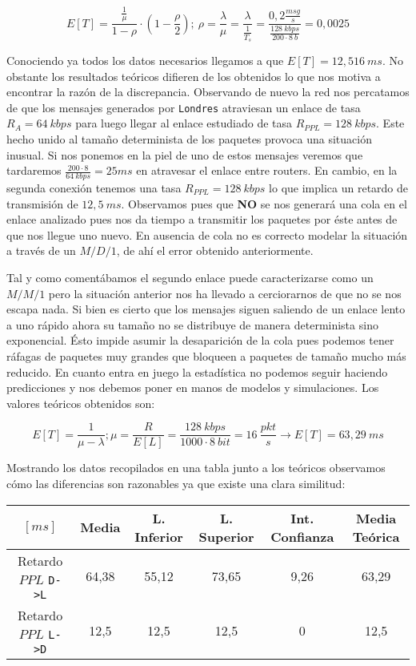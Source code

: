 \documentclass{article}[10pt]
\begin{document}
		$$E[T] = \frac{\frac{1}{\mu}}{1 - \rho} \cdot (1 - \frac{\rho}{2});\ \rho = \frac{\lambda}{\mu} = \frac{\lambda}{\frac{1}{T_s}} = \frac{0,2 \frac{msg}{s}}{\frac{128\ kbps}{200 \cdot 8\ b}} = 0,0025$$

		Conociendo ya todos los datos necesarios llegamos a que $E[T] = 12,516\ ms$. No obstante los resultados teóricos difieren de los obtenidos lo que nos motiva a encontrar la razón de la discrepancia. Observando de nuevo la red nos percatamos de que los mensajes generados por \texttt{Londres} atraviesan un enlace de tasa $R_A = 64\ kbps$ para luego llegar al enlace estudiado de tasa $R_{PPL} = 128\ kbps$. Este hecho unido al tamaño determinista de los paquetes provoca una situación inusual. Si nos ponemos en la piel de uno de estos mensajes veremos que tardaremos $\frac{200 \cdot 8}{64\ kbps} = 25 ms$ en atravesar el enlace entre routers. En cambio, en la segunda conexión tenemos una tasa $R_{PPL} = 128\ kbps$ lo que implica un retardo de transmisión de $12,5\ ms$. Observamos pues que \textbf{NO} se nos generará una cola en el enlace analizado pues nos da tiempo a transmitir los paquetes por éste antes de que nos llegue uno nuevo. En ausencia de cola no es correcto modelar la situación a través de un $M/D/1$, de ahí el error obtenido anteriormente.

		Tal y como comentábamos el segundo enlace puede caracterizarse como un $M/M/1$ pero la situación anterior nos ha llevado a cerciorarnos de que no se nos escapa nada. Si bien es cierto que los mensajes siguen saliendo de un enlace lento a uno rápido ahora su tamaño no se distribuye de manera determinista sino exponencial. Ésto impide asumir la desaparición de la cola pues podemos tener ráfagas de paquetes muy grandes que bloqueen a paquetes de tamaño mucho más reducido. En cuanto entra en juego la estadística no podemos seguir haciendo predicciones y nos debemos poner en manos de modelos y simulaciones. Los valores teóricos obtenidos son:

		$$E[T] = \frac{1}{\mu - \lambda}; \mu = \frac{R}{E[L]} = \frac{128\ kbps}{1000 \cdot 8\ bit} = 16\ \frac{pkt}{s} \rightarrow E[T] = 63,29\ ms$$

		Mostrando los datos recopilados en una tabla junto a los teóricos observamos cómo las diferencias son razonables ya que existe una clara similitud:

		\vskip 3mm

		\begin{center}
			\begin{tabular}{| c | c | c | c | c | c |}
				\hline
				$[ms]$ & Media & L. Inferior & L. Superior & Int. Confianza & Media Teórica\\
				\hline
				Retardo $PPL$ \texttt{D->L} & 64,38 & 55,12 & 73,65 & 9,26 & 63,29\\
				\hline
				Retardo $PPL$ \texttt{L->D} & 12,5 & 12,5 & 12,5 & 0 & 12,5\\
				\hline
			\end{tabular}
		\end{center}
\end{document}
